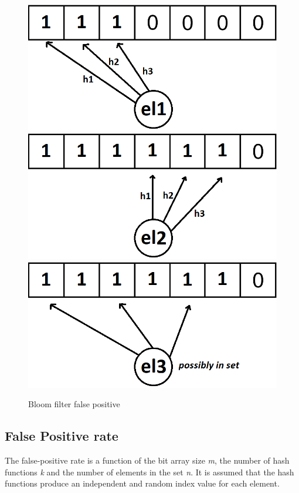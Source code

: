 \begin{figure}[!htb]
    \begin{center}
      \includegraphics[scale=0.4]{figures/fp-bloom-1.png}
      \includegraphics[scale=0.4]{figures/fp-bloom-2.png}
      \includegraphics[scale=0.4]{figures/fp-bloom-3.png}
      \caption{Bloom filter false positive}
      \label{fig:bloom-filter-fp}
    \end{center}
\end{figure}


\subsection*{False Positive rate}
The false-positive rate is a function of the bit array size \textit{m}, the number of hash functions \textit{k} and the number of elements in the set \textit{n}. It is assumed that the hash functions produce an independent and random index value for each element. 

